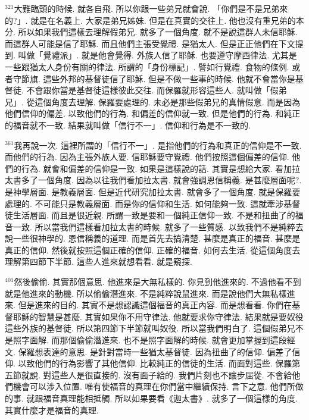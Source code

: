 \documentclass{book}
\begin{document}
$^{321}$大難臨頭的時候.
就各自飛.
所以你跟一些弟兄就會說.
「你們是不是兄弟來的?」.
就是在名義上.
大家是弟兄姊妹.
但是在真實的交往上.
他也沒有重兄弟的本分.
所以如果我們這樣去理解假弟兄.
就多了一個角度.
就不是說這群人未信耶穌.
而這群人可能是信了耶穌.
而且他們主張受覺禮.
是猶太人.
但是正正他們在下文提到.
叫做「覺禮派」.
就是他會覺得.
外族人信了耶穌.
也要遵守摩西律法.
尤其是一些跟猶太人身份有關的律法.
所謂的「身份標記」.
譬如行覺禮.
食物的條例.
或者守節旗.
這些外邦的基督徒信了耶穌.
但是不做一些事的時候.
他就不會當你是基督徒.
不會跟你當是基督徒這樣彼此交往.
而保羅就形容這些人.
就叫做「假弟兄」.
從這個角度去理解.
保羅要處理的.
未必是那些假弟兄的真情假意.
而是因為他們信仰的偏差.
以致他們的行為.
和偏差的信仰就一致.
但是他們的行為.
和純正的福音就不一致.
結果就叫做「信行不一」.
信仰和行為是不一致的.

$^{361}$我再說一次.
這裡所謂的「信行不一」.
是指他們的行為和真正的信仰是不一致.
而他們的行為.
因為主張外族人要.
信耶穌要守覺禮.
他們按照這個偏差的信仰.
他們的行為.
就會和偏差的信仰是一致.
如果是這樣說的話.
其實是想給大家.
看加拉太書多了一個角度.
因為以往我們看加拉太書.
就會強調恩信稱義.
是甚麼層面呢?.
是神學層面.
是教義層面.
但是近代研究加拉太書.
就會多了一個角度.
就是保羅要處理的.
不可能只是教義層面.
而是你的信仰和生活.
如何能夠一致.
這就牽涉基督徒生活層面.
而且是很近親.
所謂一致是要和一個純正信仰一致.
不是和扭曲了的福音一致.
所以當我們這樣看加拉太書的時候.
就多了一些質感.
以致我們不是純粹去說一些很神學的.
恩信稱義的道理.
而是首先去搞清楚.
甚麼是真正的福音.
甚麼是真正的信仰.
然後就按照這個正確的信仰.
正確的福音.
如何去生活.
從這個角度去理解第四節下半節.
這些人進來就想看看.
就是窺探.

$^{401}$然後偷偷.
其實那個意思.
他進來是大無私樣的.
你見到他進來的.
不過他看不到就是他進來的動機.
所以偷偷潛進來.
不是純粹說鼠進來.
而是說他們大無私樣進來.
但是進來的目的.
其實不是想認識這個福音的真正內容.
而是想看看.
你們在基督耶穌的智慧是甚麼.
其實如果你不用守律法.
他就要求你守律法.
結果就是要奴役這些外族的基督徒.
所以第四節下半節就叫奴役.
所以當我們明白了.
這個假弟兄不是照字面解.
而那個偷偷潛進來.
也不是照字面解的時候.
就會更加掌握到這段經文.
保羅想表達的意思.
是針對當時一些猶太基督徒.
因為扭曲了的信仰.
偏差了信仰.
以致他們的行為影響了其他信仰.
比較純正的信徒的生活.
而面對這些.
保羅第五節就說.
對這些人是很直接的.
沒有面子給的.
我們片刻也不讓步屈從.
不會給他們機會可以涉入位置.
唯有使福音的真理在你們當中繼續保持.
言下之意.
他們所做的事.
就跟福音真理能相抵觸.
所以如果要看《迦太書》.
就多了一個這樣的角度.
其實什麼才是福音的真理.
\end{document}
